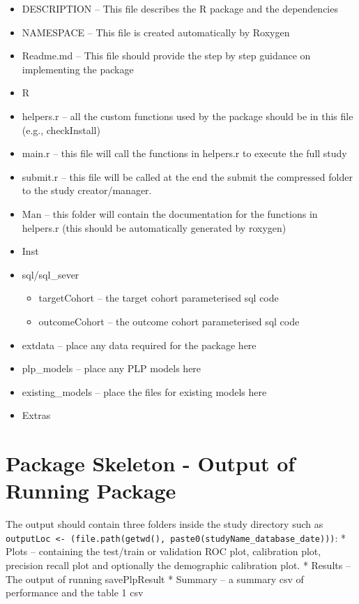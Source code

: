 \documentclass[]{article}
\providecommand{\tightlist}{%
  \setlength{\itemsep}{0pt}\setlength{\parskip}{0pt}}
\begin{document}
\begin{itemize}
\tightlist
\item
  DESCRIPTION -- This file describes the R package and the dependencies
\item
  NAMESPACE -- This file is created automatically by Roxygen
\item
  Readme.md -- This file should provide the step by step guidance on
  implementing the package
\item
  R
\item
  helpers.r -- all the custom functions used by the package should be in
  this file (e.g., checkInstall)
\item
  main.r -- this file will call the functions in helpers.r to execute
  the full study
\item
  submit.r -- this file will be called at the end the submit the
  compressed folder to the study creator/manager.
\item
  Man -- this folder will contain the documentation for the functions in
  helpers.r (this should be automatically generated by roxygen)
\item
  Inst
\item
  sql/sql\_sever

  \begin{itemize}
  \tightlist
  \item
    targetCohort -- the target cohort parameterised sql code
  \item
    outcomeCohort -- the outcome cohort parameterised sql code
  \end{itemize}
\item
  extdata -- place any data required for the package here
\item
  plp\_models -- place any PLP models here
\item
  existing\_models -- place the files for existing models here
\item
  Extras
\end{itemize}

\section{Package Skeleton - Output of Running
Package}\label{package-skeleton---output-of-running-package}

The output should contain three folders inside the study directory such
as
\texttt{outputLoc\ \textless{}-\ (file.path(getwd(),\ paste0(studyName\_database\_date)))}:
* Plots -- containing the test/train or validation ROC plot, calibration
plot, precision recall plot and optionally the demographic calibration
plot. * Results -- The output of running savePlpResult * Summary -- a
summary csv of performance and the table 1 csv
\end{document}

